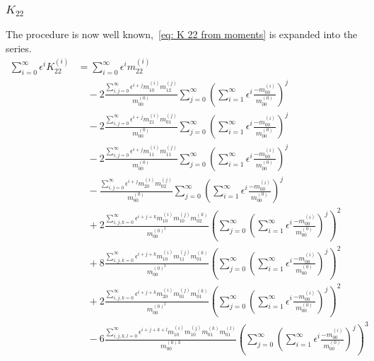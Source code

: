 \subsubsection{\texorpdfstring{$K_{22}$}{K 22}}
\label{subs:K 22}
The procedure is now well known,~\eqref{eq: K 22 from moments} is expanded into the series.
\begin{equation}
  \begin{aligned}
  \sum_{i=0}^\infty \epsilon^i K_{22}^{(i)}
  & = \sum_{i=0}^\infty \epsilon^i m_{22}^{(i)}
  \\& \quad
  - 2 \frac{ \sum_{i,j=0}^\infty \epsilon^{i+j} m_{10}^{(i)} m_{12}^{(j)} }{m_{00}^{(0)}}
   \sum_{j=0}^\infty {\left(\sum_{i=1}^\infty \epsilon^i \frac{ - m_{00}^{(i)}}{ m_{00}^{(0)}}\right)}^j
  \\& \quad
  - 2 \frac{ \sum_{i,j=0}^\infty \epsilon^{i+j} m_{21}^{(i)} m_{01}^{(j)} }{m_{00}^{(0)}}
   \sum_{j=0}^\infty {\left(\sum_{i=1}^\infty \epsilon^i \frac{ - m_{00}^{(i)}}{ m_{00}^{(0)}}\right)}^j
  \\& \quad
  - 2 \frac{ \sum_{i,j=0}^\infty \epsilon^{i+j} m_{11}^{(i)} m_{11}^{(j)} }{m_{00}^{(0)}}
   \sum_{j=0}^\infty {\left(\sum_{i=1}^\infty \epsilon^i \frac{ - m_{00}^{(i)}}{ m_{00}^{(0)}}\right)}^j
  \\& \quad
  -   \frac{ \sum_{i,j=0}^\infty \epsilon^{i+j} m_{20}^{(i)} m_{02}^{(j)} }{m_{00}^{(0)}}
   \sum_{j=0}^\infty {\left(\sum_{i=1}^\infty \epsilon^i \frac{ - m_{00}^{(i)}}{ m_{00}^{(0)}}\right)}^j
  \\& \quad
  + 2 \frac{ \sum_{i,j,k=0}^\infty \epsilon^{i+j+k} m_{10}^{(i)}m_{10}^{(j)}m_{02}^{(k)} }
  {m_{00}^{{(0)}^2}}
   {\left(
     \sum_{j=0}^\infty {\left(\sum_{i=1}^\infty \epsilon^i \frac{ - m_{00}^{(i)}}{ m_{00}^{(0)}}\right)}^j
   \right)}^2
  \\& \quad
  + 8 \frac{ \sum_{i,j,k=0}^\infty \epsilon^{i+j+k} m_{10}^{(i)}m_{11}^{(j)}m_{01}^{(k)} }
  {m_{00}^{{(0)}^2}}
   {\left(
     \sum_{j=0}^\infty {\left(\sum_{i=1}^\infty \epsilon^i \frac{ - m_{00}^{(i)}}{ m_{00}^{(0)}}\right)}^j
   \right)}^2
  \\& \quad
  + 2 \frac{ \sum_{i,j,k=0}^\infty \epsilon^{i+j+k} m_{20}^{(i)}m_{01}^{(j)}m_{01}^{(k)} }
  {m_{00}^{{(0)}^2}}
   {\left(
     \sum_{j=0}^\infty {\left(\sum_{i=1}^\infty \epsilon^i \frac{ - m_{00}^{(i)}}{ m_{00}^{(0)}}\right)}^j
   \right)}^2
  \\& \quad
  - 6 \frac{ \sum_{i,j,k,l=0}^\infty \epsilon^{i+j+k+l} m_{10}^{(i)}m_{10}^{(j)}m_{01}^{(k)}m_{01}^{(l)}}{m_{00}^{(0)3}}
   {\left(
     \sum_{j=0}^\infty {\left(\sum_{i=1}^\infty \epsilon^i \frac{ - m_{00}^{(i)}}{ m_{00}^{(0)}}\right)}^j
   \right)}^3
   \end{aligned}
 \end{equation}

